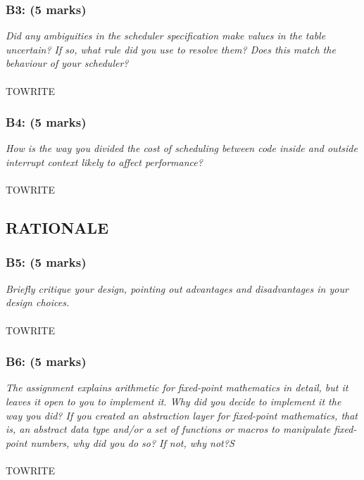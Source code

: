 \documentclass{article}
\begin{document}
\subsubsection*{B3: (5 marks) }
\textit{Did any ambiguities in the scheduler specification make values in the table uncertain?  If so, what rule did you use to resolve them?  Does this match the behaviour of your scheduler?}
\\ \\
TOWRITE

\subsubsection*{B4: (5 marks) }
\textit{How is the way you divided the cost of scheduling between code inside and outside interrupt context likely to affect performance?}
\\ \\
TOWRITE

\subsection{RATIONALE}

\subsubsection*{B5: (5 marks) }
\textit{Briefly critique your design, pointing out advantages and disadvantages in your design choices.}
\\ \\
TOWRITE

\subsubsection*{B6: (5 marks) }
\textit{The assignment explains arithmetic for fixed-point mathematics in detail, but it leaves it open to you to implement it.  Why did you decide to implement it the way you did?  If you created an abstraction layer for fixed-point mathematics, that is, an abstract data type and/or a set of functions or macros to manipulate fixed-point numbers, why did you do so?  If not, why not?S}
\\ \\
TOWRITE
\end{document}
